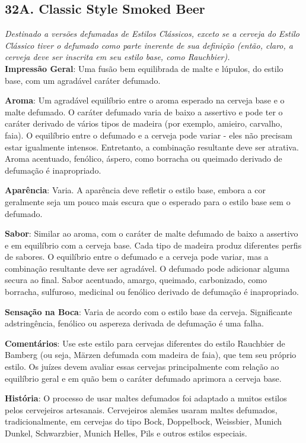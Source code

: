 \subsection*{32A. Classic Style Smoked Beer}
\textit{Destinado a versões defumadas de Estilos Clássicos, exceto se a cerveja do Estilo Clássico tiver o defumado como parte inerente de sua definição (então, claro, a cerveja deve ser inscrita em seu estilo base, como Rauchbier).}\\
\textbf{Impressão Geral}: Uma fusão bem equilibrada de malte e lúpulos, do estilo base, com um agradável caráter defumado.

\textbf{Aroma}: Um agradável equilíbrio entre o aroma esperado na cerveja base e o malte defumado. O caráter defumado varia de baixo a assertivo e pode ter o caráter derivado de vários tipos de madeira (por exemplo, amieiro, carvalho, faia). O equilíbrio entre o defumado e a cerveja pode variar - eles não precisam estar igualmente intensos. Entretanto, a combinação resultante deve ser atrativa. Aroma acentuado, fenólico, áspero, como borracha ou queimado derivado de defumação é inapropriado.

\textbf{Aparência}: Varia. A aparência deve refletir o estilo base, embora a cor geralmente seja um pouco mais escura que o esperado para o estilo base sem o defumado.

\textbf{Sabor}: Similar ao aroma, com o caráter de malte defumado de baixo a assertivo e em equilíbrio com a cerveja base. Cada tipo de madeira produz diferentes perfis de sabores. O equilíbrio entre o defumado e a cerveja pode variar, mas a combinação resultante deve ser agradável. O defumado pode adicionar alguma secura ao final. Sabor acentuado, amargo, queimado, carbonizado, como borracha, sulfuroso, medicinal ou fenólico derivado de defumação é inapropriado.

\textbf{Sensação na Boca}: Varia de acordo com o estilo base da cerveja. Significante adstringência, fenólico ou aspereza derivada de defumação é uma falha.

\textbf{Comentários}: Use este estilo para cervejas diferentes do estilo Rauchbier de Bamberg (ou seja, Märzen defumada com madeira de faia), que tem seu próprio estilo. Os juízes devem avaliar essas cervejas principalmente com relação ao equilíbrio geral e em quão bem o caráter defumado aprimora a cerveja base.

\textbf{História}: O processo de usar maltes defumados foi adaptado a muitos estilos pelos cervejeiros artesanais. Cervejeiros alemães usaram maltes defumados, tradicionalmente, em cervejas do tipo Bock, Doppelbock, Weissbier, Munich Dunkel, Schwarzbier, Munich Helles, Pils e outros estilos especiais.

